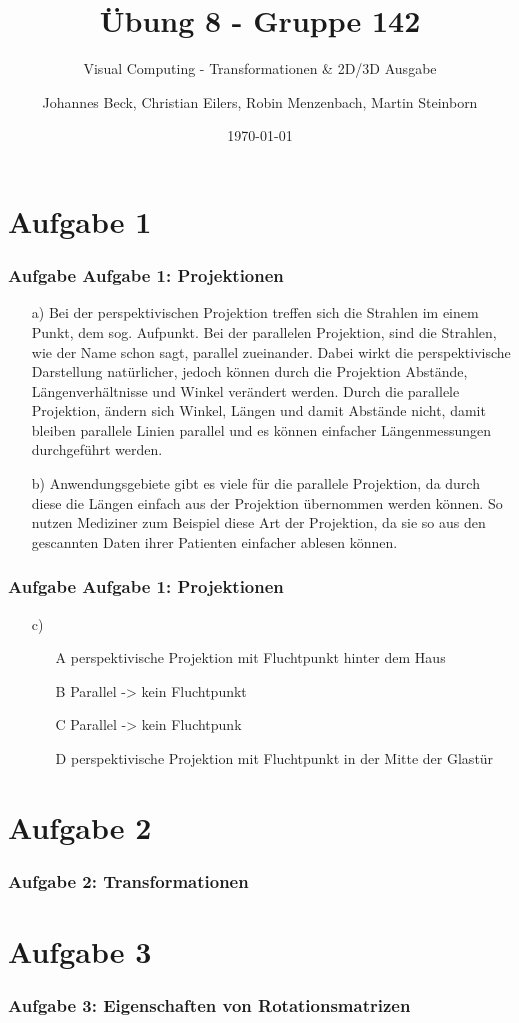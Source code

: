 \documentclass[accentcolor=tud9c,colorbacktitle,inverttitle,landscape,german,presentation,t]{tudbeamer}
\begin{document}
\title{\"Ubung 8 - Gruppe 142}
\subtitle{Visual Computing - Transformationen \& 2D/3D Ausgabe}

\author[Johannes Beck, Christian Eilers, Robin Menzenbach, Martin Steinborn]{Johannes Beck, Christian Eilers, Robin Menzenbach, Martin Steinborn}


\date{\today}

\begin{titleframe}
\end{titleframe}

\section{Aufgabe 1}
	\begin{frame}
		\frametitle{Aufgabe Aufgabe 1: Projektionen}
		\begin{itemize}
		\item[a)] Bei der perspektivischen Projektion treffen sich die Strahlen im einem Punkt, dem sog. Aufpunkt. Bei der parallelen Projektion, sind die Strahlen, wie der Name schon sagt, parallel zueinander. Dabei wirkt die perspektivische Darstellung natürlicher, jedoch können durch die Projektion Abstände, Längenverhältnisse und Winkel verändert werden. Durch die parallele Projektion, ändern sich Winkel, Längen und damit Abstände nicht, damit bleiben parallele Linien parallel und es können einfacher Längenmessungen durchgeführt werden.
		\item[b)] Anwendungsgebiete gibt es viele für die parallele Projektion, da durch diese die Längen einfach aus der Projektion übernommen werden können. So nutzen Mediziner zum Beispiel diese Art der Projektion, da sie so aus den gescannten Daten ihrer Patienten einfacher ablesen können.
		\end{itemize}
	\end{frame}

	\begin{frame}
		\frametitle{Aufgabe Aufgabe 1: Projektionen}
		\begin{itemize}
		\item[c)] 
		\begin{itemize}
			\item[A] perspektivische Projektion mit Fluchtpunkt hinter dem Haus
			\item[B] Parallel -> kein Fluchtpunkt
			\item[C] Parallel -> kein Fluchtpunk
			\item[D] perspektivische Projektion mit Fluchtpunkt in der Mitte der Glastür
		\end{itemize}
		\end{itemize}
	\end{frame}

\section{Aufgabe 2}
\begin{frame}
	\frametitle{Aufgabe 2: Transformationen}
\end{frame}

\section{Aufgabe 3}
\begin{frame}
	\frametitle{Aufgabe 3: Eigenschaften von Rotationsmatrizen} %
\end{frame}
\end{document}
